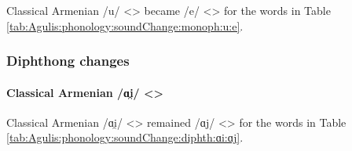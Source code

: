 Classical Armenian /u/ <> became /e/ <> for the words in Table \ref{tab:Agulis:phonology:soundChange:monoph:u:e}. 


\begin{table}[H]
	\centering
	\caption{Change from Classical Armenian /u/ <> to /e/ <> in the Agulis dialect}
	\label{tab:Agulis:phonology:soundChange:monoph:u:e}
\end{table}

\subsubsection{Diphthong changes}

\paragraph{Classical Armenian /ɑi̯/ <>}

Classical Armenian /ɑi̯/ <> remained /ɑj/ <> for the words in Table \ref{tab:Agulis:phonology:soundChange:diphth:ɑi:ɑj}. 

